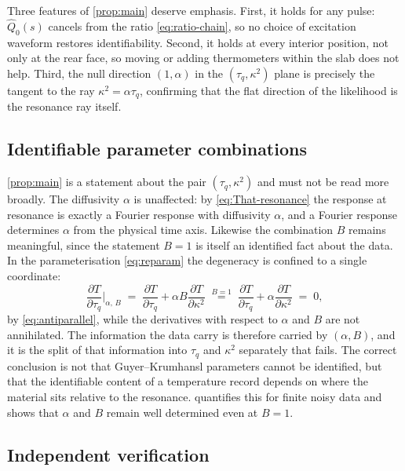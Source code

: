 \documentclass[preprint,12pt,a4paper]{elsarticle}
\theoremstyle{plain}
\theoremstyle{definition}
\theoremstyle{remark}
\newcommand{\tq}{\tau_{q}}
\newcommand{\kk}{\kappa^{2}}
\newcommand{\Bnum}{B}
\begin{document}
Three features of \cref{prop:main} deserve emphasis. First, it holds for any
pulse: $\hat{Q}_{0}(s)$ cancels from the ratio \eqref{eq:ratio-chain}, so no
choice of excitation waveform restores identifiability. Second, it holds at
every interior position, not only at the rear face, so moving or adding
thermometers within the slab does not help. Third, the null direction
$(1,\alpha)$ in the $(\tq,\kk)$ plane is precisely the tangent to the ray
$\kk = \alpha\tq$, confirming that the flat direction of the likelihood is the
resonance ray itself.

\subsection{Identifiable parameter combinations}
\label{sec:struct-remains}

\cref{prop:main} is a statement about the pair $(\tq, \kk)$ and must not be
read more broadly. The diffusivity $\alpha$ is unaffected: by
\eqref{eq:That-resonance} the response at resonance is exactly a Fourier
response with diffusivity $\alpha$, and a Fourier response determines $\alpha$
from the physical time axis. Likewise the combination $\Bnum$ remains
meaningful, since the statement $\Bnum = 1$ is itself an identified fact about
the data. In the parameterisation \eqref{eq:reparam} the degeneracy is confined
to a single coordinate:
%
\begin{equation}
  \frac{\partial T}{\partial \tq}\bigg|_{\alpha,\,\Bnum}
  \;=\;
  \frac{\partial T}{\partial \tq}
  + \alpha \Bnum \frac{\partial T}{\partial \kk}
  \;\overset{\Bnum=1}{=}\;
  \frac{\partial T}{\partial \tq}
  + \alpha \frac{\partial T}{\partial \kk}
  \;=\; 0 ,
  \label{eq:reparam-degeneracy}
\end{equation}
%
by \eqref{eq:antiparallel}, while the derivatives with respect to $\alpha$ and
$\Bnum$ are not annihilated. The information the data carry is therefore
carried by $(\alpha, \Bnum)$, and it is the split of that information into
$\tq$ and $\kk$ separately that fails. The correct conclusion is not that
Guyer--Krumhansl parameters cannot be identified, but that the identifiable
content of a temperature record depends on where the material sits relative to
the resonance.  quantifies this for finite noisy data and
shows that $\alpha$ and $\Bnum$ remain well determined even at $\Bnum = 1$.

\subsection{Independent verification}
\label{sec:struct-verify}
\end{document}
